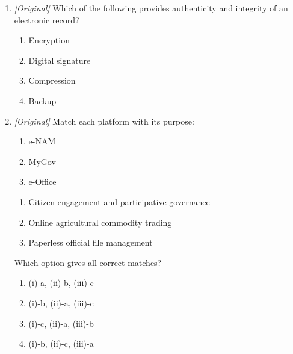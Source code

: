 \begin{enumerate}[label=\textbf{Q\arabic*.}, leftmargin=*]
\begin{enumerate}[label=\Alph*.]
    \item DigiLocker --- secure digital wallet for authentic documents
    \item UMANG --- agricultural commodity trading
    \item GeM --- digital document storage
  \end{enumerate}
\item \textit{[Original]} Which of the following provides authenticity and
  integrity of an electronic record?
  \begin{enumerate}[label=\Alph*.]
    \item Encryption
    \item Digital signature
    \item Compression
    \item Backup
  \end{enumerate}
\item \textit{[Original]} Match each platform with its purpose:
  \begin{enumerate}[label=(\roman*)]
    \item e-NAM
    \item MyGov
    \item e-Office
  \end{enumerate}
  \begin{enumerate}[label=(\alph*)]
    \item Citizen engagement and participative governance
    \item Online agricultural commodity trading
    \item Paperless official file management
  \end{enumerate}
  Which option gives all correct matches?
  \begin{enumerate}[label=\Alph*.]
    \item (i)-a, (ii)-b, (iii)-c
    \item (i)-b, (ii)-a, (iii)-c
    \item (i)-c, (ii)-a, (iii)-b
    \item (i)-b, (ii)-c, (iii)-a
  \end{enumerate}


\end{enumerate}
